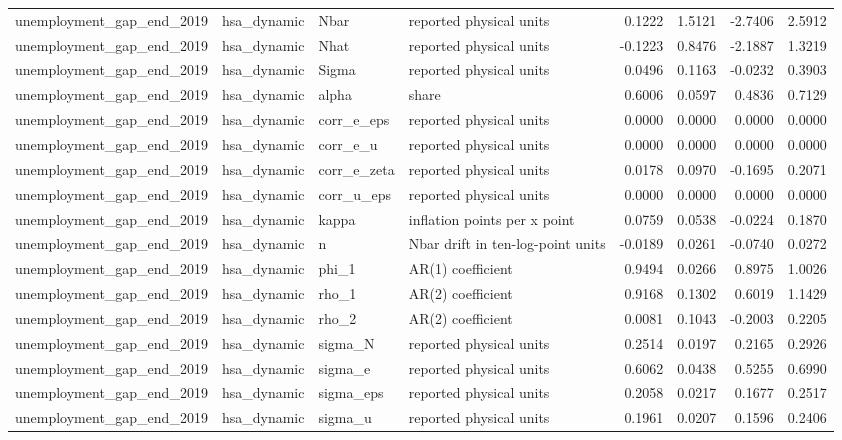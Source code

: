 \begin{tabular}{llllrrrr}
unemployment\_gap\_end\_2019 & hsa\_dynamic & Nbar & reported physical units & 0.1222 & 1.5121 & -2.7406 & 2.5912 \\
unemployment\_gap\_end\_2019 & hsa\_dynamic & Nhat & reported physical units & -0.1223 & 0.8476 & -2.1887 & 1.3219 \\
unemployment\_gap\_end\_2019 & hsa\_dynamic & Sigma & reported physical units & 0.0496 & 0.1163 & -0.0232 & 0.3903 \\
unemployment\_gap\_end\_2019 & hsa\_dynamic & alpha & share & 0.6006 & 0.0597 & 0.4836 & 0.7129 \\
unemployment\_gap\_end\_2019 & hsa\_dynamic & corr\_e\_eps & reported physical units & 0.0000 & 0.0000 & 0.0000 & 0.0000 \\
unemployment\_gap\_end\_2019 & hsa\_dynamic & corr\_e\_u & reported physical units & 0.0000 & 0.0000 & 0.0000 & 0.0000 \\
unemployment\_gap\_end\_2019 & hsa\_dynamic & corr\_e\_zeta & reported physical units & 0.0178 & 0.0970 & -0.1695 & 0.2071 \\
unemployment\_gap\_end\_2019 & hsa\_dynamic & corr\_u\_eps & reported physical units & 0.0000 & 0.0000 & 0.0000 & 0.0000 \\
unemployment\_gap\_end\_2019 & hsa\_dynamic & kappa & inflation points per x point & 0.0759 & 0.0538 & -0.0224 & 0.1870 \\
unemployment\_gap\_end\_2019 & hsa\_dynamic & n & Nbar drift in ten-log-point units & -0.0189 & 0.0261 & -0.0740 & 0.0272 \\
unemployment\_gap\_end\_2019 & hsa\_dynamic & phi\_1 & AR(1) coefficient & 0.9494 & 0.0266 & 0.8975 & 1.0026 \\
unemployment\_gap\_end\_2019 & hsa\_dynamic & rho\_1 & AR(2) coefficient & 0.9168 & 0.1302 & 0.6019 & 1.1429 \\
unemployment\_gap\_end\_2019 & hsa\_dynamic & rho\_2 & AR(2) coefficient & 0.0081 & 0.1043 & -0.2003 & 0.2205 \\
unemployment\_gap\_end\_2019 & hsa\_dynamic & sigma\_N & reported physical units & 0.2514 & 0.0197 & 0.2165 & 0.2926 \\
unemployment\_gap\_end\_2019 & hsa\_dynamic & sigma\_e & reported physical units & 0.6062 & 0.0438 & 0.5255 & 0.6990 \\
unemployment\_gap\_end\_2019 & hsa\_dynamic & sigma\_eps & reported physical units & 0.2058 & 0.0217 & 0.1677 & 0.2517 \\
unemployment\_gap\_end\_2019 & hsa\_dynamic & sigma\_u & reported physical units & 0.1961 & 0.0207 & 0.1596 & 0.2406 \\

\end{tabular}

